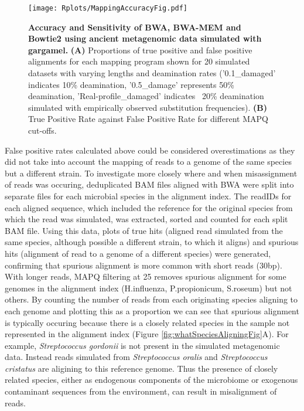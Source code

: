 \documentclass[12pt, a4paper]{article}
\begin{document}
\begin{figure}[ht!]
	\begin{center}
	\texttt{[image: Rplots/MappingAccuracyFig.pdf]}
	\end{center}
	\small\caption[Accuracy and Sensitivity of BWA, BWA-MEM and Bowtie2 using ancient metagenomic data simulated with gargamel.]{\textbf{Accuracy and Sensitivity of BWA, BWA-MEM and Bowtie2 using ancient metagenomic data simulated with gargamel.} \footnotesize{\textbf{(A)} Proportions of true positive and false positive alignments for each mapping program shown for 20 simulated datasets with varying lengths and deamination rates ('0.1\_damaged' indicates 10\% deamination, '0.5\_damage' represents 50\% deamination, 'Real-profile\_damaged' indicates ~20\% deamination simulated with empirically observed substitution frequencies). \textbf{(B)} True Positive Rate against False Positive Rate for different MAPQ cut-offs.} }\label{fig:mappingAccuracy}
\end{figure}
\clearpage

False positive rates calculated above could be considered overestimations as they did not take into account the mapping of reads to a genome of the same species but a different strain. 
To investigate more closely where and when misassignment of reads was occuring, deduplicated BAM files aligned with BWA were split into separate files for each microbial species in the alignment index. 
The readIDs for each aligned sequence, which included the reference for the original species from which the read was simulated, was extracted, sorted and counted for each split BAM file.
Using this data, plots of true hits (aligned read simulated from the same species, although possible a different strain, to which it aligns) and spurious hits (alignment of read to a genome of a different species) were generated, confirming that spurious alignment is more common with short reads (30bp). 
With longer reads, MAPQ filtering at 25 removes spurious alignment for some genomes in the alignment index (H.influenza, P.propionicum, S.roseum) but not others. 
By counting the number of reads from each originating species aligning to each genome and plotting this as a proportion we can see that spurious alignment is typically occuring because there is a closely related species in the sample not represented in the alignment index (Figure \ref{fig:whatSpeciesAligningFig}A).
For example, \textit{Streptococcus gordonii} is not present in the simulated metagenomic data.
Instead reads simulated from \textit{Streptococcus oralis} and \textit{Streptococcus cristatus} are aligining to this reference genome.
Thus the presence of closely related species, either as endogenous components of the microbiome or exogenous contaminant sequences from the environment, can result in misalignment of reads.
\end{document}
